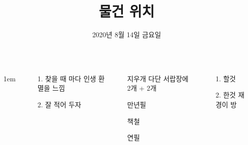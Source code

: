 \documentclass[20pt, a1paper ]{tikzposter}
\title{ 물건 위치 }
\author{ 2020년 
				8월 
				14일 
				금요일 }
\begin{document}
	\maketitle

	\begin{columns}


			{
					\setlength{\leftmargini}{7em}
					\setlength{\labelsep} {1em}
				\begin{LARGE}
					\begin{itemize}
					\item [1.] 찾을 때 마다 인생 환멸을 느낌
					\item [2.]  잘 적어 두자
					\end{itemize}
				\end{LARGE}
			}


		{
			\setlength{\leftmargini}{7em}			
			\setlength{\labelsep}{1em} %

			\begin{LARGE}
			\begin{itemize}
			\item [지우개] 다단 서랍장에 2개 + 2개 
			\item [만년필]
			\item [책철] 
			\item [연필] 


			\end{itemize}
			\end{LARGE}

		}

		{
			\setlength{\leftmargini}{5em}			
			\setlength{\labelsep}{1em} %
			\begin{LARGE}
			\begin{itemize}
			\item [1.] 할것 
			\item [2.] 한것 재경이 방
			\end{itemize}
			\end{LARGE}

}
\end{columns}
\end{document}
